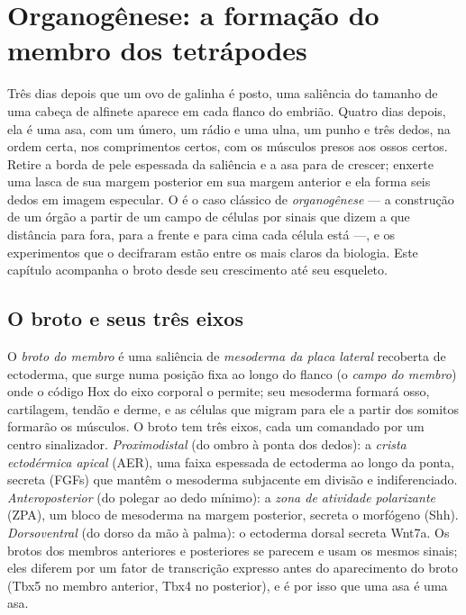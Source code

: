 \chapter{Organogênese: a formação do membro dos tetrápodes}\label{ch:b2:limb-organogenesis}

Três dias depois que um ovo de galinha é posto, uma saliência do
tamanho de uma cabeça de alfinete aparece em cada flanco do embrião.
Quatro dias depois, ela é uma asa, com um úmero, um rádio e uma ulna,
um punho e três dedos, na ordem certa, nos comprimentos certos, com os
músculos presos aos ossos certos. Retire a borda de pele espessada da
saliência e a asa para de crescer; enxerte uma lasca de sua margem
posterior em sua margem anterior e ela forma seis dedos em imagem
especular. O  é o caso clássico de
\emph{organogênese} --- a construção de um órgão a partir de um campo
de células por sinais que dizem a que distância para fora, para a
frente e para cima cada célula está ---, e os experimentos que o
decifraram estão entre os mais claros da biologia. Este capítulo
acompanha o broto desde seu crescimento até seu esqueleto.

\section{O broto e seus três eixos}

\begin{definition}\label{def:b2:limb-organogenesis:bud}
O \emph{broto do membro} é uma saliência de \emph{mesoderma da placa
lateral} recoberta de ectoderma, que surge numa posição fixa ao longo
do flanco (o \emph{campo do membro}) onde o código Hox do eixo corporal
o permite; seu mesoderma formará osso, cartilagem, tendão e derme, e as
células que migram para ele a partir dos somitos formarão os músculos.
O broto tem três eixos, cada um comandado por um centro sinalizador.
\emph{Proximodistal} (do ombro à ponta dos dedos): a \emph{crista
ectodérmica apical} (AER), uma faixa espessada de ectoderma ao longo da
ponta, secreta  (FGFs) que
mantêm o mesoderma subjacente em divisão e indiferenciado.
\emph{Anteroposterior} (do polegar ao dedo mínimo): a \emph{zona de
atividade polarizante} (ZPA), um bloco de mesoderma na margem
posterior, secreta o morfógeno \emph{} (Shh).
\emph{Dorsoventral} (do dorso da mão à palma): o ectoderma dorsal
secreta Wnt7a. Os brotos dos membros anteriores e posteriores se
parecem e usam os mesmos sinais; eles diferem por um fator de
transcrição expresso antes do aparecimento do broto (Tbx5 no membro
anterior, Tbx4 no posterior), e é por isso que uma asa é uma asa.
\end{definition}

